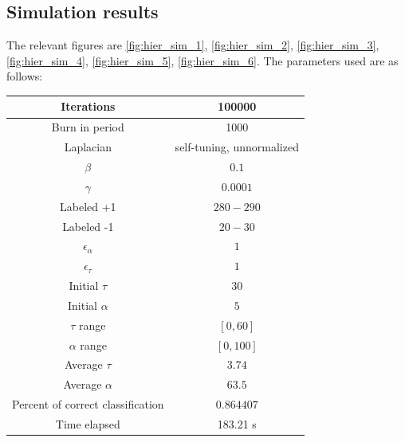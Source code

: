 \documentclass{siamart1116}
\begin{document}
\subsection{Simulation results}
The relevant figures are \cref{fig:hier_sim_1}, \cref{fig:hier_sim_2}, \cref{fig:hier_sim_3}, \cref{fig:hier_sim_4}, \cref{fig:hier_sim_5}, \cref{fig:hier_sim_6}. The parameters used are as follows:
\begin{center}
\begin{tabular}{| c | c |}
\hline
Iterations & 100000 \\ \hline
Burn in period & 1000 \\ \hline
Laplacian & self-tuning, unnormalized \\ \hline
$\beta$ & $0.1$\\ \hline
$\gamma$ & $0.0001$\\ \hline
Labeled +1 & $280-290$ \\ \hline
Labeled -1 & $20-30$ \\ \hline
$\epsilon_\alpha$ & $1$\\ \hline
$\epsilon_\tau$ & $1$\\ \hline
Initial $\tau$ & $30$\\ \hline
Initial $\alpha$ & $5$\\ \hline
$\tau$ range & $[0, 60]$\\ \hline
$\alpha$ range & $[0, 100]$\\ \hline
Average $\tau$ & $3.74$\\ \hline
Average $\alpha$ & $63.5$\\ \hline
Percent of correct classification & $0.864407$ \\ \hline
Time elapsed & 183.21 s \\ \hline
\end{tabular}
\end{center}
\end{document}
